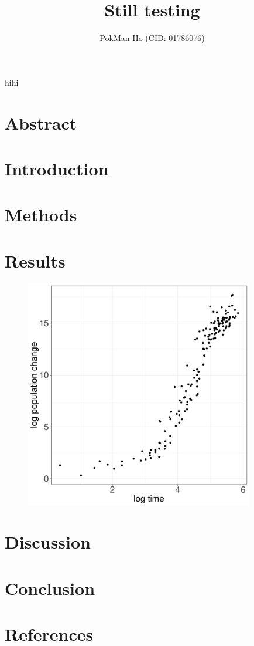 \documentclass[a4paper, 11pt]{article}
\title{Still testing}
\author{PokMan Ho (CID: 01786076)}
\date{}
\begin{document}
	\maketitle
	hihi\autocite{zwietering1994modeling}
	\section*{Abstract}
	\section*{Introduction}
	\section*{Methods}
	\section*{Results}
	\begin{figure}[h]
		\centering\includegraphics[width=10cm]{Log_data.pdf}
	\end{figure}
	\section*{Discussion}
	\section*{Conclusion}
	\section*{References}
	\nocite{*}\printbibliography
\end{document}
